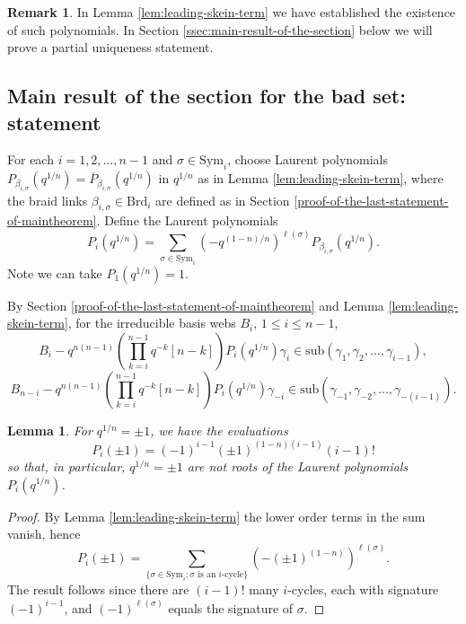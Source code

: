 \documentclass[12pt,
	]{amsart}
\newtheorem{lemma}[theorem]{Lemma}
\theoremstyle{definition}
\newtheorem{remark}[theorem]{Remark}
\renewcommand{\bar}{\overline}
\newcommand{\mrm}[1]{\mathrm{#1}}
\newcommand{\lp}{\left(}\newcommand{\rp}{\right)}
\newcommand{\sub}[1]{\mrm{sub}\lp#1\rp}
\newcommand{\rev}[1]{\bar{#1}}
\newcommand{\sym}{\mrm{Sym}}
\newcommand{\qroot}{q^{1/n}}
\newcommand{\braid}{\mrm{Brd}}
\begin{document}
\begin{remark}\label{rem:remarkwithaquestion}
In Lemma \ref{lem:leading-skein-term}  we have established the existence of such polynomials.  In Section \ref{ssec:main-result-of-the-section} below we will prove a partial uniqueness statement.
\end{remark}

\subsection{Main result of the section for the bad set:  statement}\label{ssec:main-statement-of-the-section}

For each $i=1,2,\dots,n-1$ and $\sigma\in\sym_i$, choose Laurent polynomials $P_{\beta_{i,\sigma}}(\qroot)=\rev{P}_{\beta_{i,\sigma}}(\qroot)$ in $\qroot$ as in Lemma \ref{lem:leading-skein-term}, where the braid links $\beta_{i,\sigma}\in\braid_i$ are defined as in Section \ref{proof-of-the-last-statement-of-maintheorem}.  Define the Laurent polynomials
\begin{equation*}
P_i(\qroot)=\sum_{\sigma\in\sym_i}\lp-q^{(1-n)/n}\rp^{\ell(\sigma)}P_{\beta_{i,\sigma}}(\qroot).
\end{equation*}
Note we can take $P_1(\qroot)=1$.  

By Section \ref{proof-of-the-last-statement-of-maintheorem} and Lemma \ref{lem:leading-skein-term}, for the irreducible basis webs $B_i$, $1\leq i\leq n-1$,
\begin{equation*}\label{eq:rootsinduction1}\tag{$\ast$}
B_i-q^{n(n-1)}\lp\prod_{k=i}^{n-1}q^{-k}[n-k]\rp P_i(\qroot)\gamma_i\in\sub{\gamma_1,\gamma_2,\dots,\gamma_{i-1}},
\end{equation*}
\begin{equation*}\label{eq:rootsinduction2}\tag{$\ast\ast$}
B_{n-i}-q^{n(n-1)}\lp\prod_{k=i}^{n-1}q^{-k}[n-k]\rp P_i(\qroot)\gamma_{-i}\in\sub{\gamma_{-1},\gamma_{-2},\dots,\gamma_{-(i-1)}}.
\end{equation*}

\begin{lemma}\label{prop:nopm1roots}
For $\qroot=\pm1$, we have the evaluations 
\begin{equation*}
P_i(\pm1)=(-1)^{i-1}(\pm1)^{(1-n)(i-1)}(i-1)!
\end{equation*}
so that, in particular, $\qroot=\pm1$ are not roots of the Laurent polynomials $P_i(\qroot)$.  
\end{lemma}

\begin{proof}
By Lemma \ref{lem:leading-skein-term} the lower order terms in the sum vanish, hence
\begin{equation*}
P_i(\pm1)=\sum_{\{\sigma\in\sym_i;\sigma\text{ is an }i\text{-cycle}\}}\lp-(\pm1)^{(1-n)}\rp^{\ell(\sigma)}.
\end{equation*}
The result follows since there are $(i-1)!$ many $i$-cycles, each with signature $(-1)^{i-1}$, and $(-1)^{\ell(\sigma)}$ equals the signature of $\sigma$.
\end{proof}
\end{document}
